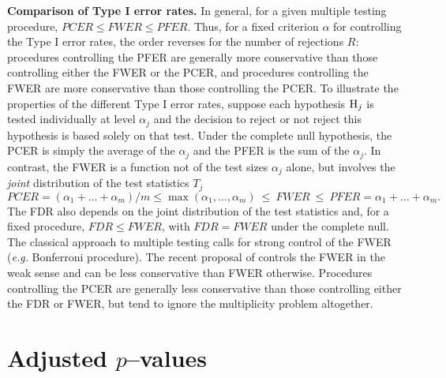 \documentclass[11pt]{article}
\begin{document}

{\bf Comparison of Type I error rates.} In general, for a given
multiple testing procedure, $PCER \leq FWER \leq PFER$. Thus, for a
fixed criterion $\alpha$ for controlling the Type I error rates, the
order reverses for the number of rejections $R$: procedures
controlling the PFER are generally more conservative than those
controlling either the FWER or the PCER, and procedures controlling
the FWER are more conservative than those controlling the PCER. To illustrate the properties
of the different Type I error rates, suppose each hypothesis ${\rm
  H}_j$ is tested individually at level $\alpha_j$ and the decision to
reject or not reject this hypothesis is based solely on that test. Under the complete null hypothesis, the PCER is simply the average of the $\alpha_j$ and the PFER is the sum of the $\alpha_j$. In contrast, the FWER is a function not of the test sizes $\alpha_j$ alone, but involves the {\it joint} distribution of the test statistics $T_j$ 
$$PCER = (\alpha_1 + \ldots + \alpha_m)/m \leq \max( \alpha_1, \ldots, \alpha_m) \ \leq \ FWER \ \leq \ PFER = \alpha_1 + \ldots + \alpha_m.$$
The FDR also depends on the joint distribution of the test statistics and, for a fixed procedure, $FDR \leq FWER$, with $FDR = FWER$ under the complete null. The classical approach to multiple testing calls for strong control of the FWER ({\it e.g.} Bonferroni procedure). The recent proposal of \cite{Benjamini&Hochberg95} controls the FWER in the weak sense and can be less conservative than FWER otherwise. Procedures controlling the PCER are generally less conservative than those controlling either the FDR or FWER, but tend to ignore the multiplicity problem altogether. 

\section{Adjusted $p$--values}\label{sadjp}
\end{document}
